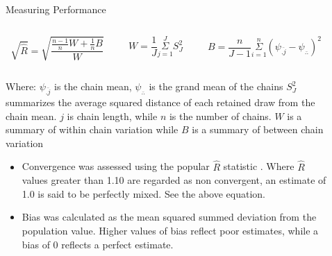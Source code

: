 \documentclass[final,hyperref={pdfpagelabels=false}]{beamer}
\begin{document}
\begin{frame}[t]
\begin{columns}[t]
\begin{column}{.465\textwidth}
\begin{block}{Measuring Performance}
\begin{columns}
\begin{column}{.32\textwidth}
		$$ \sqrt{\hat{R}} = \sqrt{\frac{\frac{n-1}{n}W + \frac{1}{n}B}{W}}$$
			\end{column}
			\begin{column}{.27\textwidth} %
		$$W = \frac{1}{J}\stackrel{J}{\underset{j = 1}{\Sigma}} S_{J}^2$$
			\end{column}
			\begin{column}{.40\textwidth} %
		$$B = \frac{n}{J-1}\stackrel{n}{\underset{i = 1}{\Sigma}}(\psi_{\bar{.j}}- \psi_{\bar{..}})^2$$
			\end{column}
		\end{columns} %
		\begin{center}
		\scriptsize{Where: $\psi_{\bar{.j}}$ is the chain mean, $\psi_{\bar{..}}$ is the grand mean of the chains $S_{J}^2$ summarizes the average squared distance of each retained draw from the chain mean. $j$ is chain length, while $n$ is the number of chains. $W$ is a summary of within chain variation while $B$ is a summary of between chain variation}
				\end{center}	
			\begin{itemize}
					\item Convergence was assessed using the popular $\hat{R}$ statistic \cite{gelman1992inference}. Where $\hat{R}$ values greater than 1.10 are regarded as non convergent, an estimate of 1.0 is said to be perfectly mixed. See the above equation.
			\end{itemize}
			\begin{itemize}
		\item Bias was calculated as the mean squared summed deviation from the population value. Higher values of bias reflect poor estimates, while a bias of 0 reflects a perfect estimate.
	\end{itemize}
\end{block}


\end{column} %

\begin{column}{.03\textwidth}\end{column} %
 
\begin{column}{.465\textwidth} %


\end{column}
\end{columns}
\end{frame}
\end{document}
